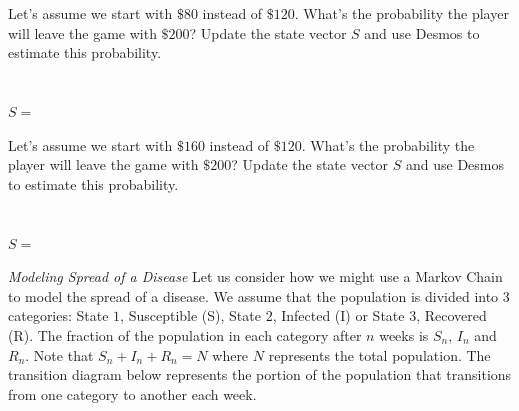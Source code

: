 \documentclass[11pt]{article}
\begin{document}
{{ \newpage
 
 
\task Let's assume we start with $\$80$ instead of $\$120$. What's the probability the player will leave the game with $\$200$? Update the state vector $S$ and use Desmos to estimate this probability. \\
\\\\
$S=$


\task  Let's assume we start with $\$160$ instead of $\$120$. What's the probability the player will leave the game with $\$200$? Update the state vector $S$ and use Desmos to estimate this probability. \\
\\\\
$S=$


}
\newpage
\item  {\em Modeling Spread of a Disease}  Let us consider how we might use a Markov Chain to model the spread of a disease. We assume that the population is divided into $3$ categories:   State $1$, Susceptible (S), State $2$,  Infected (I) or  State $3$, Recovered (R).  The fraction of the population in each category after $n$ weeks is $S_n$, $I_n$ and $R_n$. Note that $S_n+I_n+R_n=N$ where $N$ represents the total population.  The transition diagram below represents the portion of the population that transitions from one category to another each week.
\begin{center}
\end{center}
}
\end{document}
